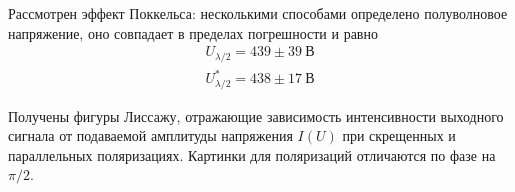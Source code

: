 \documentclass[a4paper, 12pt]{article}
\begin{document}
Рассмотрен эффект Поккельса: несколькими способами определено
полуволновое напряжение, оно совпадает в пределах погрешности
и равно
\begin{equation}
    \begin{gathered}
        U_{\lambda/2} = 439 \pm 39\ \text{В} \\
        U_{\lambda/2}^{*} = 438 \pm 17\ \text{В}
    \end{gathered}
\end{equation}

Получены фигуры
Лиссажу, отражающие зависимость интенсивности выходного
сигнала от подаваемой амплитуды напряжения $I(U)$ при
скрещенных и параллельных поляризациях. Картинки для
поляризаций отличаются по фазе на $\pi/2$.
\end{document}
